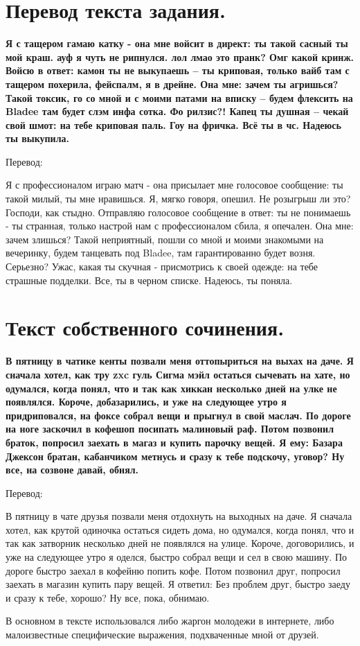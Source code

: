 \documentclass{article} \usepackage[utf8]{inputenc}
\title{} \author{Нестеров Б. А. 507} \date{}
\begin{document}
\maketitle

\section{Перевод текста задания.}  \textbf{Я с тащером гамаю катку - она мне
войсит в директ: ты такой сасный ты мой краш. ауф я чуть не рипнулся. лол лмао
это пранк? Омг какой кринж. Войсю в ответ: камон ты не выкупаешь – ты криповая,
только вайб там с тащером похерила, фейспалм, я в дрейне.  Она мне: зачем ты
агришься? Такой токсик, го со мной и с моими патами на вписку – будем флексить
на Bladee там будет слэм инфа сотка. Фо рилзис?! Капец ты душная – чекай свой
шмот: на тебе криповая паль. Гоу на фричка. Всё ты в чс. Надеюсь ты выкупила.}

Перевод:

Я с профессионалом играю матч - она присылает мне голосовое сообщение: ты такой милый, ты
мне нравишься. Я, мягко говоря, опешил.  Не розыгрыш ли это? Господи, как
стыдно. Отправляю голосовое сообщение в ответ: ты не понимаешь - ты странная,
только настрой нам с профессионалом сбила, я опечален. Она мне: зачем злишься? Такой
неприятный, пошли со мной и моими знакомыми на вечеринку, будем танцевать под
Bladee, там гарантированно будет возня. Серьезно? Ужас, какая ты скучная -
присмотрись к своей одежде: на тебе страшные подделки.  Все, ты в черном списке.
Надеюсь, ты поняла.
\section{Текст собственного сочинения.}  \textbf{В пятницу в чатике кенты
позвали меня оттопыриться на выхах на даче. Я сначала хотел, как тру zxc гуль
Сигма мэйл остаться сычевать на хате, но одумался, когда понял, что и так как
хиккан несколько дней на улке не появлялся.  Короче, добазарились, и уже на
следующее утро я придриповался, на фоксе собрал вещи и прыгнул в свой маслач. По
дороге на ноге заскочил в кофешоп посипать малиновый раф. Потом позвонил браток,
попросил заехать в магаз и купить парочку вещей.  Я ему: Базара Джексон братан,
кабанчиком метнусь и сразу к тебе подскочу, уговор? Ну все, на созвоне давай,
обнял.  }

Перевод:

В пятницу в чате друзья позвали меня отдохнуть на выходных на даче. Я сначала
хотел, как крутой одиночка остаться сидеть дома, но одумался, когда понял, что и
так как затворник несколько дней не появлялся на улице. Короче, договорились, и
уже на следующее утро я оделся, быстро собрал вещи и сел в свою машину. По
дороге быстро заехал в кофейню попить кофе. Потом позвонил друг, попросил заехать
в магазин купить пару вещей. Я ответил: Без проблем друг, быстро заеду и сразу к
тебе, хорошо?  Ну все, пока, обнимаю.

В основном в тексте использовался либо жаргон молодежи в интернете, либо
малоизвестные специфические выражения, подхваченные мной от друзей.
\end{document}
